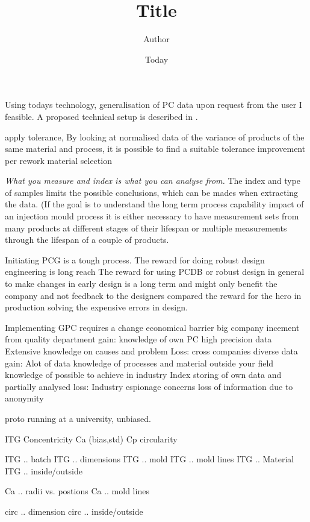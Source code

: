 \documentclass[]{article}
\begin{document}
\title{Title}
\author{Author}
\date{Today}
\maketitle

Using todays technology, generalisation of PC data upon request from the user I feasible. A proposed technical setup is described in \cite{OkholmRask******* Techpaper}.

apply tolerance, By looking at normalised data of the variance of products of the same material and process, it is possible to find a suitable tolerance
improvement per rework
material selection

\emph{What you measure and index is what you can analyse from.}
The index and type of samples limits the possible conclusions, which can be mades when extracting the data.  (If the goal is to understand the long term process capability impact of an injection mould process it is either necessary to have measurement sets from many products at different stages of their lifespan or multiple measurements through the lifespan of a couple of products.   

Initiating PCG is a tough process. 
The reward for doing robust design engineering is long reach
The reward for using PCDB or robust design in general to make changes in early design is a long term and might only benefit the company and not feedback to the designers compared the reward for the hero in production solving the expensive errors in design.

Implementing GPC requires a change
	economical barrier
		big company
			incement from quality department
			gain: 	knowledge of own PC
					high precision data
					Extensive knowledge on causes and problem
			Loss:
		cross companies
			diverse data
			gain:		Alot of data
					knowledge of processes and material outside your field
					knowledge of possible to achieve in industry
					Index storing of own data and partially analysed
			loss:		Industry espionage concerns
					loss of information due to anonymity

proto running at a university, unbiased.


ITG
Concentricity
Ca (bias,std)
Cp
circularity

ITG .. batch
ITG .. dimensions
ITG .. mold
ITG .. mold lines
ITG .. Material
ITG .. inside/outside

Ca .. radii vs. postions
Ca .. mold lines

circ .. dimension
circ .. inside/outside
\end{document}
